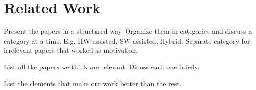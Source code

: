\section{Related Work}
\label{sec:related_work}

Present the papers in a structured way. Organize them in categories and discuss a category at a time. E.g. HW-assisted, SW-assisted, Hybrid. Separate category for irrelevant papers that worked as motivation.

List all the papers we think are relevant. Dicuss each one briefly.

List the elements that make our work better than the rest.
